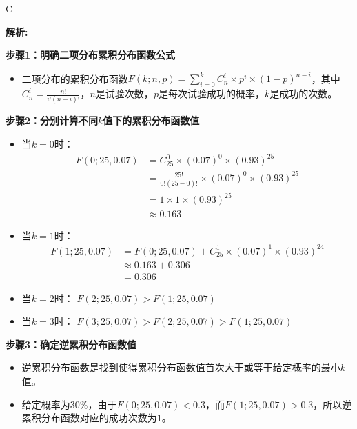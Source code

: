 \documentclass{article}
\newenvironment{explanation}
{\textbf{解析:}\par}
{\par}
\begin{document}
    \begin{correctanswer}
        C
    \end{correctanswer}
    
    \begin{explanation}
    \textbf{步骤1：明确二项分布累积分布函数公式}
    \begin{itemize}
    \item 二项分布的累积分布函数\(F(k;n,p)=\sum_{i = 0}^{k}C_{n}^i\times p^{i}\times(1 - p)^{n - i}\)，其中\(C_{n}^i=\frac{n!}{i!(n - i)!}\)，\(n\)是试验次数，\(p\)是每次试验成功的概率，\(k\)是成功的次数。
    \end{itemize}
    \textbf{步骤2：分别计算不同\(k\)值下的累积分布函数值}
    \begin{itemize}
        \item 当\(k = 0\)时：
        \begin{align*}
        F(0; 25, 0.07) &= C_{25}^0 \times (0.07)^{0} \times (0.93)^{25} \\
                        &= \frac{25!}{0!(25 - 0)!} \times (0.07)^{0} \times (0.93)^{25} \\
                        &= 1 \times 1 \times (0.93)^{25} \\
                        &\approx 0.163
        \end{align*}
        
        \item 当\(k = 1\)时：
        \begin{align*}
        F(1; 25, 0.07) &= F(0; 25, 0.07) + C_{25}^1 \times (0.07)^{1} \times (0.93)^{24} \\
                        &\approx 0.163 + 0.306 \\
                        &= 0.306
        \end{align*}
    \item 当\(k = 2\)时：
        \(F(2; 25, 0.07) > F(1; 25, 0.07) \)
    \item 当\(k = 3\)时：
        \(F(3; 25, 0.07) > F(2; 25, 0.07) > F(1; 25, 0.07)\)
    \end{itemize}
    \textbf{步骤3：确定逆累积分布函数值}
    \begin{itemize}
    \item 逆累积分布函数是找到使得累积分布函数值首次大于或等于给定概率的最小\(k\)值。
    \item 给定概率为\(30\%\)，由于\(F(0;25,0.07)<0.3\)，而\(F(1;25,0.07)>0.3\)，所以逆累积分布函数对应的成功次数为\(1\)。
    \end{itemize}
    \end{explanation}
    
\end{document}

